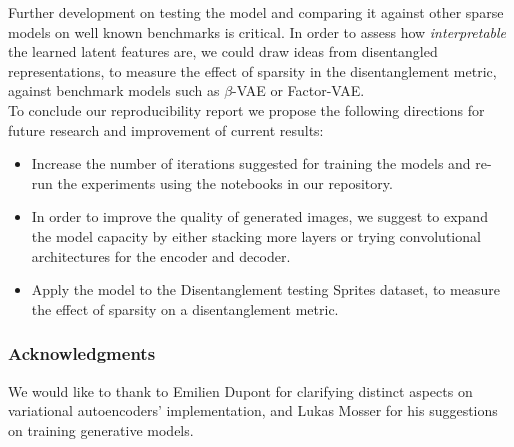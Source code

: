 Further development on testing the model and comparing it against other sparse models on well known benchmarks is critical. In order to assess how \textit{interpretable} the learned latent features are, we could draw ideas from disentangled representations, to measure the effect of sparsity in the disentanglement metric, against benchmark models such as $\beta$-VAE or Factor-VAE. \\

To conclude our reproducibility report we propose the following directions for future research and improvement of current results:
\begin{itemize}
    \item  Increase the number of iterations suggested for training the models and re-run the experiments using the notebooks in our repository.
    \item  In order to improve the quality of generated images, we suggest to expand the model capacity by either stacking more layers or trying convolutional architectures for the encoder and decoder. 
    \item Apply the model to the Disentanglement testing Sprites dataset, to measure the effect of sparsity on a disentanglement metric.
\end{itemize}


\subsubsection*{Acknowledgments}

We would like to thank to Emilien Dupont for clarifying distinct aspects on variational autoencoders' implementation, and Lukas Mosser for his suggestions on training generative models.



